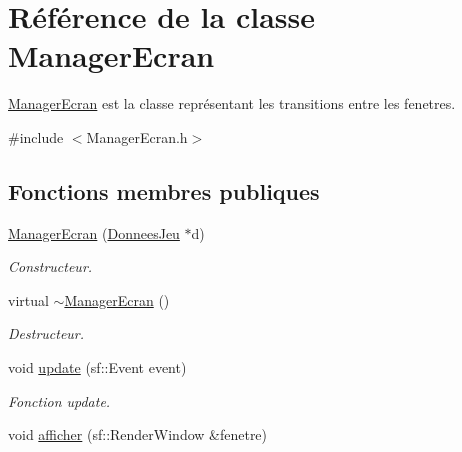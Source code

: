 \hypertarget{classManagerEcran}{\section{\-Référence de la classe \-Manager\-Ecran}
\label{classManagerEcran}
}


\hyperlink{classManagerEcran}{\-Manager\-Ecran} est la classe représentant les transitions entre les fenetres.  




{\ttfamily \#include $<$\-Manager\-Ecran.\-h$>$}

\subsection*{\-Fonctions membres publiques}
\begin{DoxyCompactItemize}
\item 
\hypertarget{classManagerEcran_ad9e96d0c51dc6c866eca240f2db1cc88}{\hyperlink{classManagerEcran_ad9e96d0c51dc6c866eca240f2db1cc88}{\-Manager\-Ecran} (\hyperlink{classDonneesJeu}{\-Donnees\-Jeu} $\ast$d)}\label{classManagerEcran_ad9e96d0c51dc6c866eca240f2db1cc88}

\begin{DoxyCompactList}\small\item\em \-Constructeur. \end{DoxyCompactList}\item 
\hypertarget{classManagerEcran_a9faf6ff983828f67ba4e0b4c319a3d7e}{virtual \hyperlink{classManagerEcran_a9faf6ff983828f67ba4e0b4c319a3d7e}{$\sim$\-Manager\-Ecran} ()}\label{classManagerEcran_a9faf6ff983828f67ba4e0b4c319a3d7e}

\begin{DoxyCompactList}\small\item\em \-Destructeur. \end{DoxyCompactList}\item 
\hypertarget{classManagerEcran_a2e47bdd001da8f6102e3ce0775d5f401}{void \hyperlink{classManagerEcran_a2e47bdd001da8f6102e3ce0775d5f401}{update} (sf\-::\-Event event)}\label{classManagerEcran_a2e47bdd001da8f6102e3ce0775d5f401}

\begin{DoxyCompactList}\small\item\em \-Fonction update. \end{DoxyCompactList}\item 
\hypertarget{classManagerEcran_a522b604974166e41863717e6abdc31a1}{void \hyperlink{classManagerEcran_a522b604974166e41863717e6abdc31a1}{afficher} (sf\-::\-Render\-Window \&fenetre)}\label{classManagerEcran_a522b604974166e41863717e6abdc31a1}


\end{DoxyCompactItemize}
